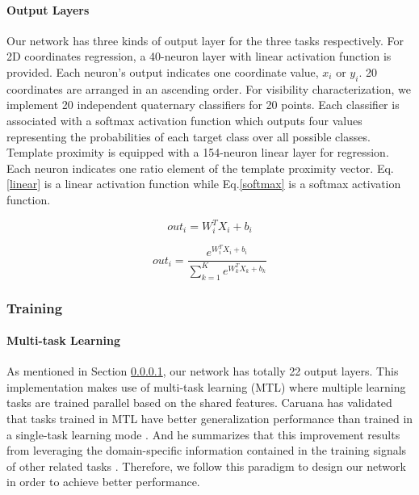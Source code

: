 \paragraph{Output Layers}
\label{output}

Our network has three kinds of output layer for the three tasks respectively. For 2D coordinates regression, a 40-neuron layer with linear activation function is provided.  Each neuron's output indicates one coordinate value, \ie $x_i$ or $y_i$.  20 coordinates are arranged in an ascending order. For visibility characterization, we implement 20 independent quaternary classifiers for 20 points. Each classifier is associated with a softmax activation function \cite{Bishop:2006:PRM:1162264} which outputs four values representing the probabilities of each target class over all possible classes. Template proximity is equipped with a 154-neuron linear layer for regression.  Each neuron indicates one ratio element of the template proximity vector. Eq.\ref{linear} is a linear activation function while Eq.\ref{softmax} is a softmax activation function.

\begin{equation}
\label{linear}
out_i = W_i^TX_i+b_i
\end{equation}

\begin{equation}
\label{softmax}
out_i = \frac{e^{W_i^TX_i+b_i}}{\sum_{k=1}^K e^{W_k^TX_k+b_k}}
\end{equation}


\subsubsection{Training}

\paragraph{Multi-task Learning}
As mentioned in Section \ref{output}, our network has totally 22 output layers. This implementation makes use of multi-task learning (MTL) where multiple learning tasks are trained parallel based on the shared features. Caruana has validated that tasks trained in MTL have better generalization performance than trained in a single-task learning mode \cite{Caruana1997}. And he summarizes that this improvement results from leveraging the domain-specific information contained in the training signals of other related tasks \cite{Caruana1997}. Therefore, we follow this paradigm to design our network in order to achieve better performance.

